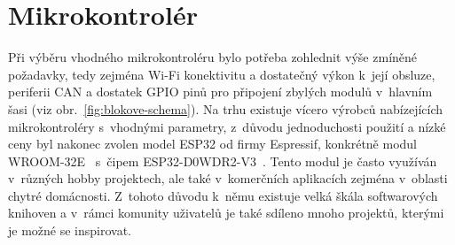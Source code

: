 \section{Mikrokontrolér}
Při výběru vhodného mikrokontroléru bylo potřeba zohlednit výše zmíněné požadavky, tedy zejména Wi-Fi konektivitu a dostatečný výkon k~její obsluze, periferii CAN a dostatek GPIO pinů pro připojení zbylých modulů v~hlavním šasi (viz obr.~\ref{fig:blokove-schema}). Na trhu existuje vícero výrobců nabízejících mikrokontroléry s~vhodnými parametry, z~důvodu jednoduchosti použití a nízké ceny byl nakonec zvolen model ESP32 od firmy Espressif, konkrétně modul WROOM-32E~\cite{esp32-wroom-32e-datasheet} s~čipem ESP32-D0WDR2-V3~\cite{esp32-datasheet}. Tento modul je často využíván v~různých hobby projektech, ale také v~komerčních aplikacích zejména v~oblasti chytré domácnosti. Z~tohoto důvodu k~němu existuje velká škála softwarových knihoven a v~rámci komunity uživatelů je také sdíleno mnoho projektů, kterými je možné se inspirovat.